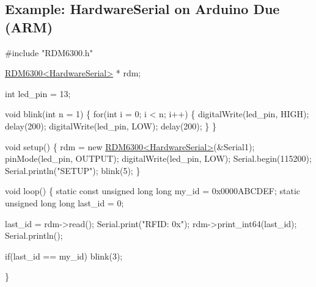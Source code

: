 \subsection*{Example\+: Hardware\+Serial on Arduino Due (A\+RM)}


\begin{DoxyCode}
\textcolor{preprocessor}{#include "RDM6300.h"}

\hyperlink{class_r_d_m6300}{RDM6300<HardwareSerial>} * rdm;

\textcolor{keywordtype}{int} led\_pin = 13;

\textcolor{keywordtype}{void} blink(\textcolor{keywordtype}{int} n = 1) 
\{
  \textcolor{keywordflow}{for}(\textcolor{keywordtype}{int} i = 0; i < n; i++) \{
    digitalWrite(led\_pin, HIGH);
    delay(200);
    digitalWrite(led\_pin, LOW);
    delay(200);
  \}
\}

\textcolor{keywordtype}{void} setup()
\{
  rdm = \textcolor{keyword}{new} \hyperlink{class_r_d_m6300}{RDM6300<HardwareSerial>}(&Serial1);
  pinMode(led\_pin, OUTPUT);
  digitalWrite(led\_pin, LOW);
  Serial.begin(115200);
  Serial.println(\textcolor{stringliteral}{"SETUP"});
  blink(5);
\}

\textcolor{keywordtype}{void} loop()
\{
  \textcolor{keyword}{static} \textcolor{keyword}{const} \textcolor{keywordtype}{unsigned} \textcolor{keywordtype}{long} \textcolor{keywordtype}{long} my\_id = 0x0000ABCDEF;
  \textcolor{keyword}{static} \textcolor{keywordtype}{unsigned} \textcolor{keywordtype}{long} \textcolor{keywordtype}{long} last\_id = 0;

  last\_id = rdm->read();
  Serial.print(\textcolor{stringliteral}{"RFID: 0x"});
  rdm->print\_int64(last\_id);
  Serial.println();

  \textcolor{keywordflow}{if}(last\_id == my\_id) blink(3);

\}
\end{DoxyCode}
 